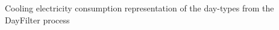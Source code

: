 Cooling electricity consumption representation of the day-types from the DayFilter process \cite{miller_automated_2015}
\label{fig:sankeyheatmap1}
